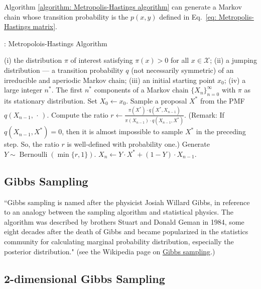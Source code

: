 \documentclass[11pt,letterpaper, leqno]{article}
\numberwithin{equation}{section}
\numberwithin{theorem}{section}
\numberwithin{lemma}{section}
\numberwithin{corollary}{section}
\numberwithin{definition}{section}
\numberwithin{proposition}{section}
\numberwithin{remark}{section}
\numberwithin{example}{section}
\begin{document}
Algorithm \ref{algorithm: Metropolis-Hastings algorithm} can generate a Markov chain whose transition probability is the $p(x,y)$ defined in Eq.~\eqref{eq: Metropolis-Hastings matrix}.
\begin{algorithm}
\caption{: Metropolois-Hastings Algorithm}\label{algorithm: Metropolis-Hastings algorithm}
\begin{algorithmic}[1]
    \INPUT (i) the distribution $\pi$ of interest satisfying $\pi(x)>0$ for all $x\in\mathcal{X}$; (ii) a jumping distribution --- a transition probability $q$ (not necessarily symmetric) of an irreducible and aperiodic Markov chain; (iii) an initial starting point $x_0$; (iv) a large integer $n^*$.
    \OUTPUT The first $n^*$ components of a Markov chain $\{X_n\}_{n=0}^\infty$ with $\pi$ as its stationary distribution.
    \STATE Set $X_0 \leftarrow x_0$.
    \STATE Sample a proposal $X^*$ from the PMF $q(X_{n-1},\, \cdot\,)$.
    \STATE Compute the ratio $r\leftarrow\frac{\pi(X^*)\cdot q(X^*, X_{n-1})}{\pi(X_{n-1})\cdot q(X_{n-1}, X^*)}$. (Remark: If $q(X_{n-1}, X^*)=0$, then it is almost impossible to sample $X^*$ in the preceding step. So, the ratio $r$ is well-defined with probability one.)
    \STATE Generate $Y\sim \operatorname{Bernoulli}(\min\{r,1\})$.
    \STATE $X_n \leftarrow Y\cdot X^* + (1-Y)\cdot X_{n-1}$.
    \ENDFOR
\end{algorithmic}
\end{algorithm}

\subsection{Gibbs Sampling}

``Gibbs sampling is named after the physicist Josiah Willard Gibbs, in reference to an analogy between the sampling algorithm and statistical physics. The algorithm was described by brothers Stuart and Donald Geman in 1984, some eight decades after the death of Gibbs \citep{geman1984stochastic} and became popularized in the statistics community for calculating marginal probability distribution, especially the posterior distribution." (see the Wikipedia page on \href{https://en.wikipedia.org/wiki/Gibbs_sampling}{Gibbs sampling}.)


\subsection{2-dimensional Gibbs Sampling}
\end{document}
